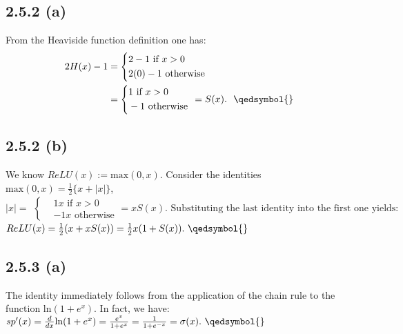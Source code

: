 \documentclass{exam}
\begin{document}
\subsection*{2.5.2 (a)}
From the Heaviside function definition one has: 
\begin{equation*}
    \begin{aligned}
        2H(x) -1 &= 
        \left\{
        \begin{aligned}
            &2 - 1 \text{ if } x > 0 \\
            &2(0)-1 \text{ otherwise}
        \end{aligned}
        \right. \\
        &= \left\{
            \begin{aligned}
                &1 \text{ if } x > 0 \\
                &-1 \text{ otherwise}
            \end{aligned}
        \right. \ 
        = S(x). \text{ \ \qedsymbol{}}
    \end{aligned}    
\end{equation*}

\subsection*{2.5.2 (b)}
We know $ReLU(x):= \text{max}(0,x)$. Consider the identities $\text{max}(0,x) = \frac{1}{2} \{ x + |x| \}$, \\
\begin{equation*}
    |x| = 
    \begin{aligned}
        \left\{
        \begin{aligned}
            &1 x \text{ if } x > 0 \\
            &-1 x \text{ otherwise}
        \end{aligned}
        \right. = x S(x) \text{. Substituting the last identity into the first one yields: }
    \end{aligned}
\end{equation*}
$ReLU(x) = \frac{1}{2}(x + x S(x)) = \frac{1}{2}x(1 + S(x)). \ \qedsymbol{}$

\subsection*{2.5.3 (a)}
The identity immediately follows from the application of the chain rule to the function $\text{ln}(1 + e^x)$. In fact, we have: 
$sp^\prime(x) = \frac{d}{d x }\text{ln}(1 + e^x) = \frac{e^x}{1 + e^x} = \frac{1}{1 + e^{-x}} = \sigma(x). \ \qedsymbol{}$
\end{document}
